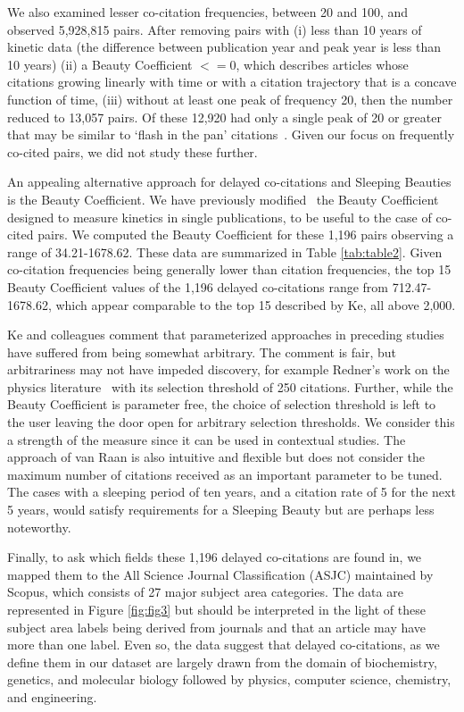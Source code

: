 \documentclass[utf8]{frontiersSCNS}
\begin{document}
We also examined lesser co-citation frequencies, between 20 and 100, and observed 5,928,815 pairs. After removing pairs with (i) less than 10 years of kinetic data (the difference between publication year and peak year is less than 10 years) (ii) a Beauty Coefficient $<=0$, which describes articles whose citations growing linearly with time or with a citation trajectory that is a concave function of time, (iii) without at least one peak of frequency 20, then the number reduced to 13,057 pairs. Of these 12,920 had only a single peak of 20 or greater that may be similar to `flash in the pan' citations~\citep{Li2013CitationCO,ye_bornmann_2018}. Given our focus on frequently co-cited pairs, we did not study these further.

An appealing alternative approach for delayed co-citations and Sleeping Beauties is the Beauty Coefficient. We have previously modified~\citep{devarakonda_2020}  the Beauty Coefficient~\citep{Ke2015} designed to measure kinetics in single publications, to be useful to the case of co-cited pairs. We computed the Beauty Coefficient for these 1,196 pairs observing a range of 34.21-1678.62. These data are summarized in Table \ref{tab:table2}.  Given co-citation frequencies being generally lower than citation frequencies, the top 15 Beauty Coefficient values of the 1,196 delayed co-citations range from 712.47-1678.62, which appear comparable to the top 15 described by Ke, all above 2,000.

Ke and colleagues comment that parameterized approaches in preceding studies have suffered from being somewhat arbitrary. The comment is fair, but arbitrariness may not have impeded discovery, for example Redner's work on the physics literature~\citep{redner_2005} with its selection threshold of 250 citations. Further, while the Beauty Coefficient is parameter free, the choice of selection threshold is left to the user leaving the door open for arbitrary selection thresholds. We consider this a strength of the measure since it can be used in contextual studies. The approach of van Raan is also intuitive and flexible but does not consider the maximum number of citations received as an important parameter to be tuned.  The cases with a sleeping period of ten years, and a citation rate of 5 for the next 5 years, would satisfy requirements for a Sleeping Beauty but are perhaps less noteworthy.

Finally, to ask which fields these 1,196 delayed co-citations are found in, we mapped them to the All Science Journal Classification (ASJC) maintained by Scopus, which consists of 27 major subject area categories.  The data are represented in Figure \ref{fig:fig3} but should be interpreted in the light of these subject area labels being derived from journals and that an article may have more than one label. Even so, the data suggest that delayed co-citations, as we define them in our dataset are largely drawn from the domain of biochemistry, genetics, and molecular biology followed by physics, computer science, chemistry, and engineering. 
\end{document}
